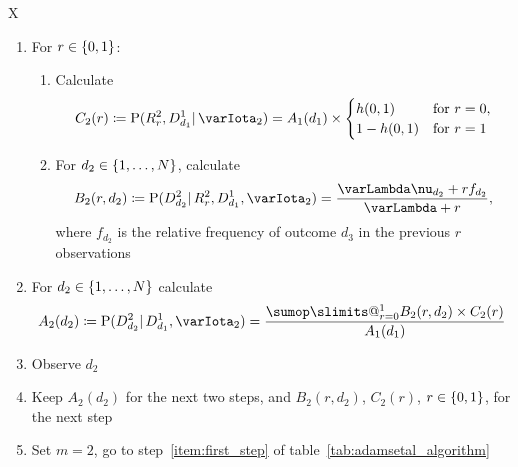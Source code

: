\documentclass[\ifafour a4paper,12pt,\else a5paper,10pt,\fi%
onecolumn,oneside,article,%
british%
]{memoir}
\makeatletter
\theoremstyle{remark}
\theoremstyle{innote}
\def\sum{\DOTSI\sumop\slimits@}
\newcommand*{\defd}{\coloneqq}
\DeclarePairedDelimiter\set{\{}{\}}
\newcommand*{\p}{\mathrm{P}}%
\renewcommand*{\|}{\mathpunct{|}}
\newcommand*{\yff}{f}
\newcommand*{\yI}{\varIota}
\newcommand*{\yMc}{\yI_2}
\newcommand*{\yN}{\varLambda}
\newcommand*{\ynn}{\nu}
\newcommand*{\yrs}{h}
\makeatother
\begin{document}
\begin{table}[!p]
\begin{tabularx}{\textwidth}{X}
\begin{enumerate}
      \bigskip
    \item For $r \in\set{0,1}$:
      \begin{enumerate}[label*=\arabic*.]
   \item Calculate
      \[
        C_2(r) \defd \p(R^{2}_{r}, D^{1}_{d_1} \| \yMc)
        =
A_1(d_1) \times \begin{cases}
          \yrs(0,1) &\text{for $r=0$},\\ 1-\yrs(0,1)&\text{for $r=1$}
        \end{cases}
      \]
      \item For $d_{2} \in \set{1,\dotsc,N}$, calculate
        \[ 
          B_{2}(r,d_{2}) \defd
          \p(D^{2}_{d_{2}} \| R^{2}_{r}, D^{1}_{d_{1}}, \yMc) =
         \frac{\yN\ynn_{d_{2}}+r\yff_{d_{2}}}{\yN + r},
        \]
     where $\yff_{d_{2}}$ is the relative frequency of outcome $d_{3}$ in
     the previous $r$ observations
    \end{enumerate}
  \item  For $d_2 \in \set{1,\dotsc,N}$ calculate
      \[A_2(d_2) \defd
        \p(D^{2}_{d_{2}} \| D^{1}_{d_{1}}, \yMc) =
\frac{\sum_{r=0}^{1} B_{2}(r,d_{2}) \times C_{2}(r)}{A_{1}(d_{1})} \]
\item Observe $d_2$
\item Keep $A_{2}(d_{2})$ for the next two steps, and
  $B_{2}(r,d_{2})$, $C_{2}(r)$, $r\in\set{0,1}$, for the next step
\item Set $m=2$, go to step~\ref{item:first_step} of table~\ref{tab:adamsetal_algorithm}
\end{enumerate}
\\\hline
  \end{tabularx}
\end{table}
\end{document}
